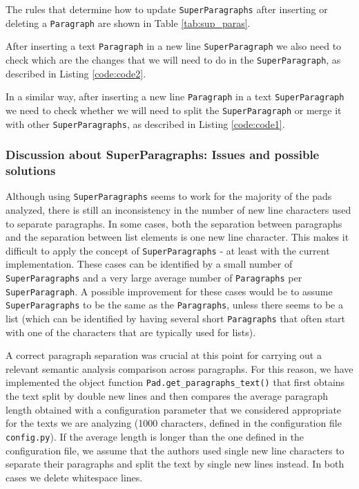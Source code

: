     The rules that determine how to update \texttt{SuperParagraphs} after inserting or deleting a \texttt{Paragraph} are shown in Table \ref{tab:sup_paras}. 

    After inserting a text \texttt{Paragraph} in a new line \texttt{SuperParagraph} we also need to check which are the changes that we will need to do in the \texttt{SuperParagraph}, as described in Listing \ref{code:code2}.
        

    In a similar way, after inserting a new line \texttt{Paragraph} in a text \texttt{SuperParagraph} we need to check whether we will need to split the \texttt{SuperParagraph} or merge it with other \texttt{SuperParagraphs}, as described in Listing \ref{code:code1}.
    

    \subsubsection{Discussion about SuperParagraphs: Issues and possible solutions}
      Although using \texttt{SuperParagraphs} seems to work for the majority of the pads analyzed, there is still an inconsistency in the number of new line characters used to separate paragraphs. In some cases, both the separation between paragraphs and the separation between list elements is one new line character. This makes it difficult to apply the concept of \texttt{SuperParagraphs} - at least with the current implementation. These cases can be identified by a small number of \texttt{SuperParagraphs} and a very large average number of \texttt{Paragraphs} per \texttt{SuperParagraph}. A possible improvement for these cases would be to assume \texttt{SuperParagraphs} to be the same as the \texttt{Paragraphs}, unless there seems to be a list (which can be identified by having several short \texttt{Paragraphs} that often start with one of the characters that are typically used for lists).
      
      A correct paragraph separation was crucial at this point for carrying out a relevant semantic analysis comparison across paragraphs. For this reason, we have implemented the object function \texttt{Pad.get\_paragraphs\_text()} that first obtains the text split by double new lines and then compares the average paragraph length obtained with a configuration parameter that we considered appropriate for the texts we are analyzing (1000 characters, defined in the configuration file \texttt{config.py}). If the average length is longer than the one defined in the configuration file, we assume that the authors used single new line characters to separate their paragraphs and split the text by single new lines instead. In both cases we delete whitespace lines.
      
